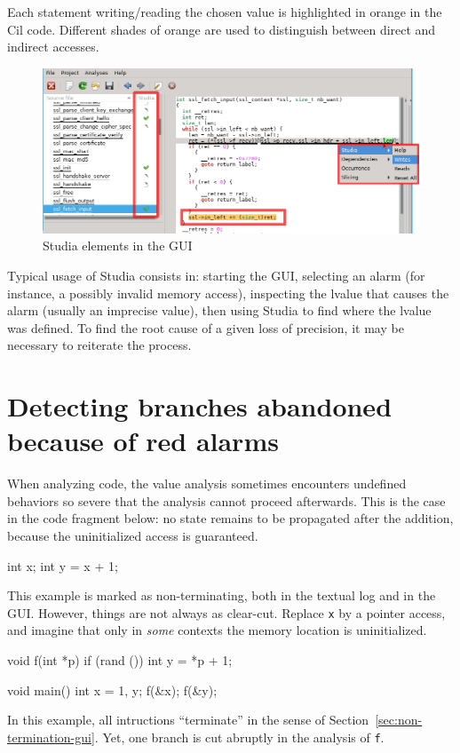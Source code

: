 Each statement writing/reading the chosen value is highlighted in orange in the
Cil code. Different shades of orange are used to distinguish between direct and
indirect accesses.

\begin{figure}[h!]
  \caption{\label{fig:studia}Studia elements in the GUI}
  \centering
    \includegraphics[width=\textwidth]{gui-images/studia}
\end{figure}

Typical usage of Studia consists in: starting the GUI, selecting an alarm
(for instance, a possibly invalid memory access), inspecting the lvalue
that causes the alarm (usually an imprecise value), then using Studia to find
where the lvalue was defined. To find the root cause of a given loss of
precision, it may be necessary to reiterate the process.

\section{Detecting branches abandoned because of red alarms}
\label{red-alarms}

When analyzing code, the value analysis sometimes encounters undefined
behaviors so severe that the analysis cannot proceed afterwards.
This is the case in the code fragment below: no state remains to be
propagated after the addition, because the uninitialized access is guaranteed.

\begin{listing-nonumber}
int x;
int y = x + 1;
\end{listing-nonumber}

This example is marked as non-terminating, both in the textual log and in
the GUI.
%
However, things are not always as clear-cut. Replace \lstinline+x+ by
a pointer access, and imagine that only in \emph{some} contexts the memory
location is uninitialized.

\begin{listing-nonumber}
void f(int *p) {
  if (rand ()) {
    int y = *p + 1;
  }
}

void main() {
  int x = 1, y;
  f(&x);
  f(&y);
}
\end{listing-nonumber}
In this example, all intructions ``terminate'' in the sense of
Section~\ref{sec:non-termination-gui}. Yet, one branch is cut abruptly
in the analysis of \lstinline+f+.

